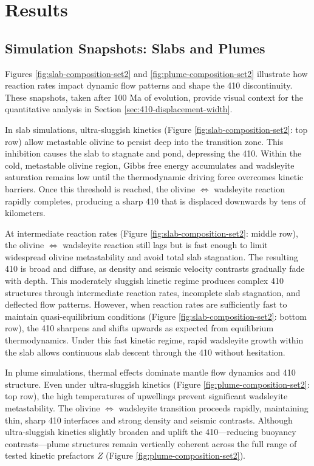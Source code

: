 \documentclass[draft,linenumbers]{agujournal2019}
\begin{document}
\section{Results}\label{sec:results}

\subsection{Simulation Snapshots: Slabs and
Plumes}\label{sec:simulation-snapshots}

Figures \ref{fig:slab-composition-set2} and
\ref{fig:plume-composition-set2} illustrate how reaction rates impact
dynamic flow patterns and shape the 410 discontinuity. These snapshots,
taken after 100 Ma of evolution, provide visual context for the
quantitative analysis in Section \ref{sec:410-displacement-width}.

In slab simulations, ultra-sluggish kinetics (Figure
\ref{fig:slab-composition-set2}: top row) allow metastable olivine to
persist deep into the transition zone. This inhibition causes the slab
to stagnate and pond, depressing the 410. Within the cold, metastable
olivine region, Gibbs free energy accumulates and wadsleyite saturation
remains low until the thermodynamic driving force overcomes kinetic
barriers. Once this threshold is reached, the olivine
\(\Leftrightarrow\) wadsleyite reaction rapidly completes, producing a
sharp 410 that is displaced downwards by tens of kilometers.

At intermediate reaction rates (Figure \ref{fig:slab-composition-set2}:
middle row), the olivine \(\Leftrightarrow\) wadsleyite reaction still
lags but is fast enough to limit widespread olivine metastability and
avoid total slab stagnation. The resulting 410 is broad and diffuse, as
density and seismic velocity contrasts gradually fade with depth. This
moderately sluggish kinetic regime produces complex 410 structures
through intermediate reaction rates, incomplete slab stagnation, and
deflected flow patterns. However, when reaction rates are sufficiently
fast to maintain quasi-equilibrium conditions (Figure
\ref{fig:slab-composition-set2}: bottom row), the 410 sharpens and
shifts upwards as expected from equilibrium thermodynamics. Under this
fast kinetic regime, rapid wadsleyite growth within the slab allows
continuous slab descent through the 410 without hesitation.

In plume simulations, thermal effects dominate mantle flow dynamics and
410 structure. Even under ultra-sluggish kinetics (Figure
\ref{fig:plume-composition-set2}: top row), the high temperatures of
upwellings prevent significant wadsleyite metastability. The olivine
\(\Leftrightarrow\) wadsleyite transition proceeds rapidly, maintaining
thin, sharp 410 interfaces and strong density and seismic contrasts.
Although ultra-sluggish kinetics slightly broaden and uplift the
410---reducing buoyancy contrasts---plume structures remain vertically
coherent across the full range of tested kinetic prefactors \(Z\)
(Figure \ref{fig:plume-composition-set2}).
\end{document}
